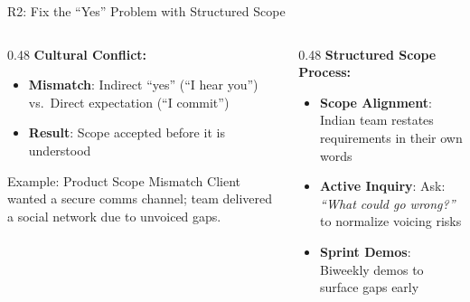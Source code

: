\documentclass[aspectratio=169, 12pt]{beamer}
\newcommand{\presenter}[1]{\gdef\currentpresenter{#1}}
\gdef\currentpresenter{}
\begin{document}
\begin{frame}{R2: Fix the ``Yes'' Problem with Structured Scope}
\presenter{Presenter: Rajamanikam GANESAN}

\vspace{0.3em}

\begin{columns}[T]
\begin{column}{0.48\textwidth}
\textbf{Cultural Conflict:}
\begin{itemize}
    \item \textbf{Mismatch}: Indirect ``yes'' (``I hear you'') vs.\ Direct expectation (``I commit'')
    \item \textbf{Result}: Scope accepted before it is understood
\end{itemize}
\vspace{0.5em}
\begin{alertblock}{Example: Product Scope Mismatch}
Client wanted a secure comms channel; team delivered a social network due to unvoiced gaps.
\end{alertblock}
\end{column}

\begin{column}{0.48\textwidth}
\textbf{Structured Scope Process:}
\begin{itemize}
    \item \textbf{Scope Alignment}: Indian team restates requirements in their own words
    \item \textbf{Active Inquiry}: Ask: \textit{``What could go wrong?''} to normalize voicing risks
    \item \textbf{Sprint Demos}: Biweekly demos to surface gaps early
\end{itemize}
\end{column}
\end{columns}

\end{frame}

\end{document}
